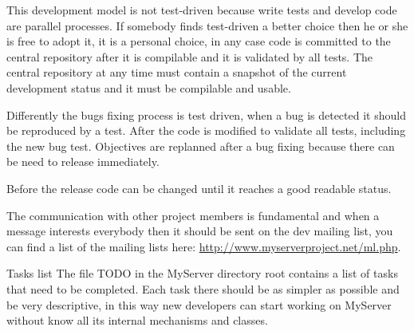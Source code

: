 \documentclass[12pt]{article}
\begin{document}
This development model is not test-driven because write tests and
develop code are parallel processes.
If somebody finds test-driven a better choice then he or she is free
to adopt it, it is a personal choice, in any case code is committed
to the central repository after it is compilable and it is validated
by all tests.
The central repository at any time must contain a snapshot of the
current development status and it must be compilable and usable.

Differently the bugs fixing process is test driven, when a bug is
detected it should be reproduced by a test.  After the code is
modified to validate all tests, including the new bug test.
Objectives are replanned after a bug fixing because there can be need
to release immediately.

Before the release code can be changed until it reaches a good
readable status.

The communication with other project members is fundamental and when a
message interests everybody then it should be sent on the dev mailing
list, you can find a list of the mailing lists here:
\url{http://www.myserverproject.net/ml.php}.

\begin{section}{Tasks list}
The file TODO in the MyServer directory root contains a list of tasks
that need to be completed.  Each task there should be as simpler as
possible and be very descriptive, in this way new developers can start
working on MyServer without know all its internal mechanisms and
classes.
\end{section}
\end{document}
